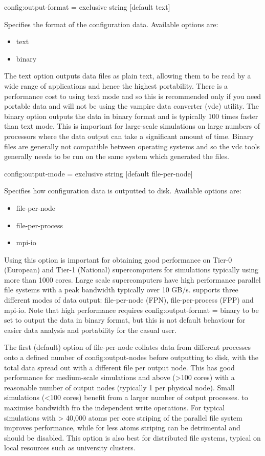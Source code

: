 {\zicf config:output-format = exclusive string [default text]}
Specifies the format of the configuration data. Available options are:

\begin{itemize}
  \item[] text
  \item[] binary
\end{itemize}

The text option outputs data files as plain text, allowing them to be read by a wide range of applications and hence the highest portability. There is a performance cost to using text mode and so this is recommended only if you need portable data and will not be using the vampire data converter (vdc) utility. The binary option outputs the data in binary format and is typically 100 times faster than text mode. This is important for large-scale simulations on large numbers of processors where the data output can take a significant amount of time. Binary files are generally not compatible between operating systems and so the vdc tools generally needs to be run on the same system which generated the
files.

{\zicf config:output-mode = exclusive string [default file-per-node]}
Specifies how configuration data is outputted to disk. Available options are:

\begin{itemize}
  \item[] file-per-node
  \item[] file-per-process
  \item[] mpi-io
\end{itemize}

Using this option is important for obtaining good performance on Tier-0 (European) and Tier-1 (National) supercomputers for simulations typically using more than 1000 cores. Large scale supercomputers have high performance parallel file systems with a peak bandwidth typically over 10 GB/s. \vampire supports three different modes of data output: file-per-node (FPN), file-per-process (FPP) and mpi-io. Note that high performance requires
config:output-format = binary to be set to output the data in binary format, but this is not default behaviour for easier data analysis and portability for the casual user.

The first (default) option of file-per-node collates data from different processes onto a defined number of config:output-nodes before
outputting to disk, with the total data spread out with a different file per output node. This has good performance for medium-scale simulations and above (>100 cores) with a reasonable number of output nodes (typically 1 per physical node). Small simulations (<100 cores) benefit from a larger number of output processes. to maximise bandwidth fro the independent write operations. For typical simulations with > 40,000 atoms per core striping of the parallel file system improves performance, while for less atoms striping can be detrimental and should be disabled. This option is also best for distributed file systems, typical on local resources such as university clusters.

